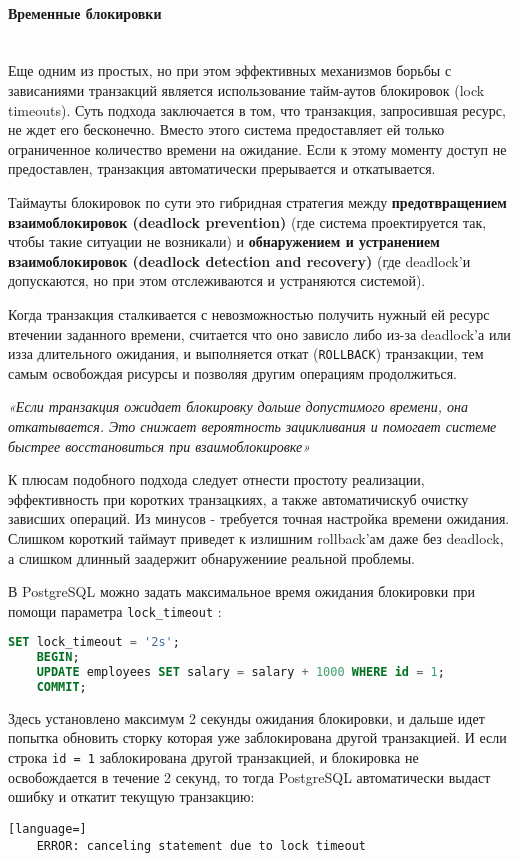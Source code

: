 \paragraph{Временные блокировки} ~\\

Еще одним из простых, но при этом эффективных механизмов борьбы с зависаниями транзакций является использование тайм-аутов блокировок (lock timeouts). Суть подхода заключается в том, что транзакция, запросившая ресурс, не ждет его бесконечно. Вместо этого система предоставляет ей только ограниченное количество времени на ожидание. Если к этому моменту доступ не предоставлен, транзакция автоматически прерывается и откатывается. \autocite[ch.18]{Silberschatz}

Таймауты блокировок по сути это гибридная стратегия между \textbf{предотвращением взаимоблокировок (deadlock prevention)} (где система проектируется так, чтобы такие ситуации не возникали) и \textbf{обнаружением и устранением взаимоблокировок (deadlock detection and recovery)} (где deadlock'и допускаются, но при этом отслеживаются и устраняются системой).

Когда транзакция сталкивается с невозможностью получить нужный ей ресурс втечении заданного времени, считается что оно зависло либо из-за deadlock'а или изза длительного ожидания, и выполняется откат (\texttt{ROLLBACK}) транзакции, тем самым освобождая рисурсы и позволяя другим операциям продолжиться.

\begin{grayquote}
    \textit{«Если транзакция ожидает блокировку дольше допустимого времени, она откатывается. Это снижает вероятность зацикливания и помогает системе быстрее восстановиться при взаимоблокировке»} \autocite[ch.18]{Silberschatz}
\end{grayquote}

К плюсам подобного подхода следует отнести простоту реализации, эффективность при коротких транзацкиях, а также автоматичискуб очистку зависших операций.
Из минусов - требуется точная настройка времени ожидания. Слишком короткий таймаут приведет к излишним rollback'ам даже без deadlock, а слишком длинный заадержит обнаружениие реальной проблемы. \autocite[ch.22]{ElmasriNavathe}

В PostgreSQL можно задать максимальное время ожидания блокировки при помощи параметра \texttt{lock\_timeout} \autocite[§19.11]{PostgreSQLdocc19}:
\begin{lstlisting}[language=SQL]
    SET lock_timeout = '2s';
    BEGIN;
    UPDATE employees SET salary = salary + 1000 WHERE id = 1;
    COMMIT;
\end{lstlisting}
Здесь установлено максимум 2 секунды ожидания блокировки, и дальше идет попытка обновить сторку которая уже заблокирована другой транзакцией. И если строка \texttt{id = 1} заблокирована другой транзакцией, и блокировка не освобождается в течение 2 секунд, то тогда PostgreSQL автоматически выдаст ошибку и откатит текущую транзакцию:
\begin{lstlisting}[language=]
    ERROR: canceling statement due to lock timeout
\end{lstlisting}

